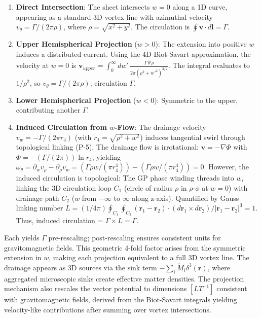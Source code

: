 \begin{enumerate}
\item \textbf{Direct Intersection}: The sheet intersects $w=0$ along a 1D curve, appearing as a standard 3D vortex line with azimuthal velocity $v_\theta = \Gamma / (2\pi \rho)$, where $\rho = \sqrt{x^2 + y^2}$. The circulation is $\oint \mathbf{v} \cdot d\mathbf{l} = \Gamma$.
\item \textbf{Upper Hemispherical Projection} ($w > 0$): The extension into positive $w$ induces a distributed current. Using the 4D Biot-Savart approximation, the velocity at $w=0$ is $\mathbf{v}_{upper} = \int_0^\infty dw' \, \frac{\Gamma \, \hat{\theta} \, \rho}{2\pi (\rho^2 + w'^2)^{3/2}}$. The integral evaluates to $1 / \rho^2$, so $v_\theta = \Gamma / (2\pi \rho)$; circulation $\Gamma$.
\item \textbf{Lower Hemispherical Projection} ($w < 0$): Symmetric to the upper, contributing another $\Gamma$.
\item \textbf{Induced Circulation from $w$-Flow}: The drainage velocity $v_w = -\Gamma / (2\pi r_4)$ (with $r_4 = \sqrt{\rho^2 + w^2}$) induces tangential swirl through topological linking (P-5). The drainage flow is irrotational: $\mathbf{v} = -\nabla \Phi$ with $\Phi = -(\Gamma / (2\pi)) \ln r_4$, yielding $\omega_\theta = \partial_w v_\rho - \partial_\rho v_w = (\Gamma \rho w / (\pi r_4^4)) - (\Gamma \rho w / (\pi r_4^4)) = 0$. However, the induced circulation is topological: The GP phase winding threads into $w$, linking the 3D circulation loop $C_1$ (circle of radius $\rho$ in $\rho$-$\phi$ at $w=0$) with drainage path $C_2$ ($w$ from $-\infty$ to $\infty$ along z-axis). Quantified by Gauss linking number $L = (1 / 4\pi) \oint_{C_1} \oint_{C_2} (\mathbf{r}_1 - \mathbf{r}_2) \cdot (d\mathbf{r}_1 \times d\mathbf{r}_2) / |\mathbf{r}_1 - \mathbf{r}_2|^3 = 1$. Thus, induced circulation = $\Gamma \times L = \Gamma$.
\end{enumerate}

Each yields $\Gamma$ pre-rescaling; post-rescaling ensures consistent units for gravitomagnetic fields. This geometric 4-fold factor arises from the symmetric extension in $w$, making each projection equivalent to a full 3D vortex line. The drainage appears as 3D sources via the sink term $-\sum_i \dot{M}_i \delta^3(\mathbf{r})$, where aggregated microscopic sinks create effective matter densities. The projection mechanism also rescales the vector potential to dimensions $[L T^{-1}]$ consistent with gravitomagnetic fields, derived from the Biot-Savart integrals yielding velocity-like contributions after summing over vortex intersections.

